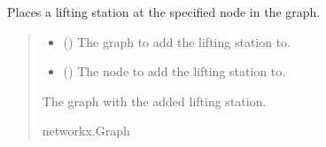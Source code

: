 \documentclass[letterpaper,10pt,english]{sphinxmanual}
\begin{document}
\begin{fulllineitems}
\label{\detokenize{pysewer:pysewer.optimization.place_lifting_station}}
\pysigstartsignatures
{}
\pysigstopsignatures
\sphinxAtStartPar
Places a lifting station at the specified node in the graph.
\begin{quote}\begin{description}
\begin{itemize}
\item {} 
\sphinxAtStartPar
{} () \textendash{} The graph to add the lifting station to.

\item {} 
\sphinxAtStartPar
{} () \textendash{} The node to add the lifting station to.

\end{itemize}

\sphinxAtStartPar
The graph with the added lifting station.

\sphinxAtStartPar
networkx.Graph

\end{description}\end{quote}

\end{fulllineitems}

\end{document}
